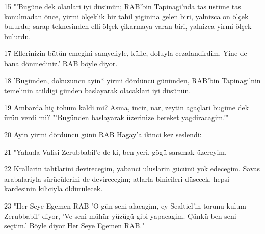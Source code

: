 \par 15 "'Bugüne dek olanlari iyi düsünün; RAB'bin Tapinagi'nda tas üstüne tas konulmadan önce, yirmi ölçeklik bir tahil yiginina gelen biri, yalnizca on ölçek bulurdu; sarap teknesinden elli ölçek çikarmaya varan biri, yalnizca yirmi ölçek bulurdu.
\par 17 Ellerinizin bütün emegini samyeliyle, küfle, doluyla cezalandirdim. Yine de bana dönmediniz.' RAB böyle diyor.
\par 18 'Bugünden, dokuzuncu ayin* yirmi dördüncü gününden, RAB'bin Tapinagi'nin temelinin atildigi günden baslayarak olacaklari iyi düsünün.
\par 19 Ambarda hiç tohum kaldi mi? Asma, incir, nar, zeytin agaçlari bugüne dek ürün verdi mi? "'Bugünden baslayarak üzerinize bereket yagdiracagim.'"
\par 20 Ayin yirmi dördüncü günü RAB Hagay'a ikinci kez seslendi:
\par 21 "Yahuda Valisi Zerubbabil'e de ki, ben yeri, gögü sarsmak üzereyim.
\par 22 Krallarin tahtlarini devirecegim, yabanci uluslarin gücünü yok edecegim. Savas arabalariyla sürücülerini de devirecegim; atlarla binicileri düsecek, hepsi kardesinin kiliciyla öldürülecek.
\par 23 "Her Seye Egemen RAB 'O gün seni alacagim, ey Sealtiel'in torunu kulum Zerubbabil' diyor, 'Ve seni mühür yüzügü gibi yapacagim. Çünkü ben seni seçtim.' Böyle diyor Her Seye Egemen RAB."


